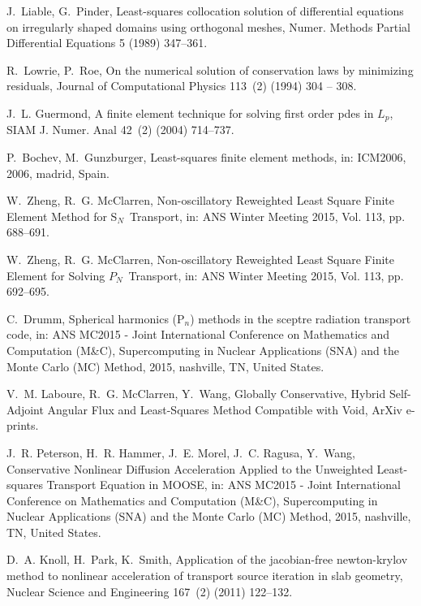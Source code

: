 \documentclass[review]{elsarticle}
\begin{document}
\begin{thebibliography}{10}
	J.~Liable, G.~Pinder, Least-squares collocation solution of differential
	equations on irregularly shaped domains using orthogonal meshes, Numer.
	Methods Partial Differential Equations 5 (1989) 347--361.
	
	R.~Lowrie, P.~Roe, On the numerical solution of conservation laws by minimizing
	residuals, Journal of Computational Physics 113~(2) (1994) 304 -- 308.
	
	J.~L. Guermond, A finite element technique for solving first order pdes in
	${L}_p$, SIAM J. Numer. Anal 42~(2) (2004) 714--737.
	
	P.~Bochev, M.~Gunzburger, {Least-squares finite element methods}, in: ICM2006,
	2006, madrid, Spain.
	
	W.~Zheng, R.~G. McClarren, {Non-oscillatory Reweighted Least Square Finite
		Element Method for S$_N$\ Transport}, in: {ANS Winter Meeting 2015}, Vol.
	113, pp. 688--691.
	
	W.~Zheng, R.~G. McClarren, {Non-oscillatory Reweighted Least Square Finite
		Element for Solving $P_N$\ Transport}, in: {ANS Winter Meeting 2015}, Vol.
	113, pp. 692--695.
	
	C.~Drumm, Spherical harmonics ({P$_n$}) methods in the sceptre radiation
	transport code, in: ANS MC2015 - Joint International Conference on
	Mathematics and Computation (M\&C), Supercomputing in Nuclear Applications
	(SNA) and the Monte Carlo (MC) Method, 2015, nashville, TN, United States.
	
	V.~M. {Laboure}, R.~G. {McClarren}, Y.~{Wang}, {Globally Conservative, Hybrid
		Self-Adjoint Angular Flux and Least-Squares Method Compatible with Void},
	ArXiv e-prints\href {http://arxiv.org/abs/1605.05388}
	{}.
	
	J.~R. Peterson, H.~R. Hammer, J.~E. Morel, J.~C. Ragusa, Y.~Wang, {Conservative
		Nonlinear Diffusion Acceleration Applied to the Unweighted Least-squares
		Transport Equation in MOOSE}, in: ANS MC2015 - Joint International Conference
	on Mathematics and Computation (M\&C), Supercomputing in Nuclear Applications
	(SNA) and the Monte Carlo (MC) Method, 2015, nashville, TN, United States.
	
	D.~A. Knoll, H.~Park, K.~Smith, Application of the jacobian-free newton-krylov
	method to nonlinear acceleration of transport source iteration in slab
	geometry, Nuclear Science and Engineering 167~(2) (2011) 122--132.
	

\end{thebibliography}
\end{document}
